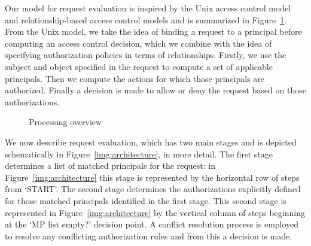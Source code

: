 \documentclass{article}
\begin{document}
Our model for request evaluation is inspired by the Unix access control model and relationship-based access control models and is summarized in Figure~\ref{img:overview}.
From the Unix model, we take the idea of binding a request to a principal before computing an access control decision, which we combine with the idea of specifying authorization policies in terms of relationships.
Firstly, we use the subject and object specified in the request to compute a set of applicable principals.
Then we compute the actions for which those principals are authorized.
Finally a decision is made to allow or deny the request based on those authorizations.


\begin{figure}[!ht]\centering
    \caption{Processing overview}\label{img:overview}
\end{figure}

We now describe request evaluation, which has two main stages and is depicted schematically in Figure~\ref{img:architecture}, in more detail.
The first stage determines a list of matched principals for the request: in Figure~\ref{img:architecture} this stage is represented by the horizontal row of steps from `START'.
The second stage determines the authorizations explicitly defined for those matched principals identified in the first stage.
This second stage is represented in Figure~\ref{img:architecture} by the vertical column of steps beginning at the `MP list empty?' decision point.
A conflict resolution process is employed to resolve any conflicting authorization rules and from this a decision is made.
\end{document}
